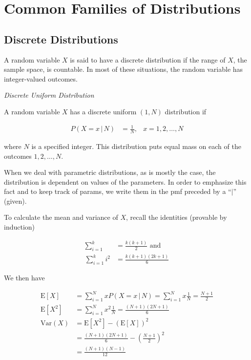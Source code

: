 \documentclass[11pt,a4paper]{report}
\theoremstyle{definition}
\theoremstyle{theorem}
\theoremstyle{example}
\begin{document}
\chapter{Common Families of Distributions}

\section{Discrete Distributions}

A random variable $X$ is said to have a discrete distribution if the range of $X$, the sample space, is countable.  In most of these situations, the random variable has integer-valued outcomes.

\textit{Discrete Uniform Distribution}

A random variable $X$ has a discrete uniform $(1,N)$ distribution if

\begin{align*}
  P(X = x \, | \, N) &= \frac{1}{N}, & x = 1, 2, \dots, N
\end{align*}

where $N$ is a specified integer.  This distribution puts equal mass on each of the outcomes $1,2,\dots,N$.

When we deal with parametric distributions, as is mostly the case, the distribution is dependent on values of the parameters.  In order to emphasize this fact and to keep track of params, we write them in the pmf preceded by a ``$|$'' (given).

To calculate the mean and variance of $X$, recall the identities (provable by induction)

\begin{align*}
  \sum_{i=1}^k &= \frac{k(k+1)}{2} \text{ and } \\
  \sum_{i=1}^k i^2 &= \frac{k(k+1)(2k+1)}{6}
\end{align*}

We then have

\begin{align*}
  \mathrm{E} \left[ X \right] &= \sum_{i=1}^N x P(X = x \, | \, N) = \sum_{i=1}^N x \frac{1}{N} = \frac{N+1}{2} \\
  \mathrm{E} \left[ X^2 \right] &= \sum_{i=1}^N x^2 \frac{1}{N} = \frac{(N+1)(2N+1)}{6} \\
  \mathrm{Var}(X) &= \mathrm{E} \left[ X^2 \right] - \left( \mathrm{E} \left[ X \right] \right)^2 \\
  &= \frac{(N+1)(2N+1)}{6} - \left( \frac{N+1}{2} \right)^2 \\
  &= \frac{(N+1)(N-1)}{12}
\end{align*}
\end{document}
